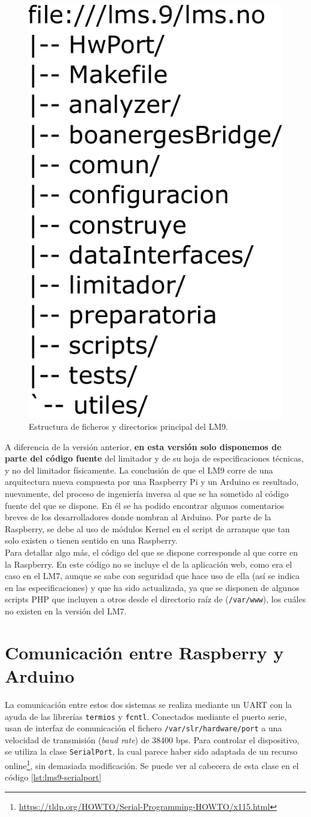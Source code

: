 \begin{figure}[h]
    \centering
    \includegraphics[width=.25\textwidth]{figuras/lms9-files.pdf}
    \caption{Estructura de ficheros y directorios principal del \acrshort{LM9}.}
    \label{fig:lm9-treeview}
\end{figure}

A diferencia de la versión anterior, \textbf{en esta versión solo disponemos de parte del código fuente} del limitador y de su hoja de especificaciones técnicas, y no del limitador físicamente. La conclusión de que el \acrshort{LM9} corre de una arquitectura nueva compuesta por una Raspberry Pi y un Arduino es resultado, nuevamente, del proceso de ingeniería inversa al que se ha sometido al código fuente del que se dispone. En él se ha podido encontrar algunos comentarios breves de los desarrolladores donde nombran al Arduino. Por parte de la Raspberry, se debe al uso de módulos Kernel en el script de arranque que tan solo existen o tienen sentido en una Raspberry. \\
Para detallar algo más, el código del que se dispone corresponde al que corre en la Raspberry. En este código no se incluye el de la aplicación web, como era el caso en el \acrshort{LM7}, aunque se sabe con seguridad que hace uso de ella (así se indica en las especificaciones) y que ha sido actualizada, ya que se disponen de algunos scripts PHP que incluyen a otros desde el directorio raíz de  (\verb|/var/www|), los cuáles no existen en la versión del \acrshort{LM7}.

\section{Comunicación entre Raspberry y Arduino} \label{sec:lms9-uart}
La comunicación entre estos dos sistemas se realiza mediante un \acrfull{UART} con la ayuda de las librerías \verb|termios| y \verb|fcntl|. Conectados mediante el puerto serie, usan de interfaz de comunicación el fichero \verb|/var/slr/hardware/port| a una velocidad de transmisión (\textit{baud rate}) de 38400 bps. Para controlar el dispositivo, se utiliza la clase \verb|SerialPort|, la cual parece haber sido adaptada de un recurso online\footnote{\url{https://tldp.org/HOWTO/Serial-Programming-HOWTO/x115.html}}, sin demasiada modificación. Se puede ver al cabecera de esta clase en el código \ref{lst:lms9-serialport}

